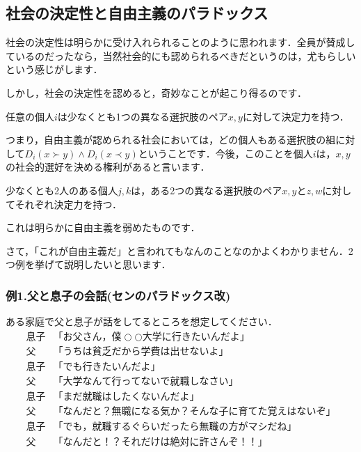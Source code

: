 \subsection{社会の決定性と自由主義のパラドックス}

社会の決定性は明らかに受け入れられることのように思われます．全員が賛成しているのだったなら，当然社会的にも認められるべきだというのは，尤もらしいという感じがします．

しかし，社会の決定性を認めると，奇妙なことが起こり得るのです．

\begin{dfn}[自由主義]
    任意の個人$i$は少なくとも1つの異なる選択肢のペア$x,y$に対して決定力を持つ．
\end{dfn}

つまり，自由主義が認められる社会においては，どの個人もある選択肢の組に対して$D_i(x \succ y) \land D_i(x \prec y)$ということです．今後，このことを個人$i$は，$x,y$の社会的選好を決める権利があると言います．

\begin{dfn}[弱い自由主義]
    少なくとも2人のある個人$j,k$は，ある2つの異なる選択肢のペア$x,y$と$z,w$に対してそれぞれ決定力を持つ．
\end{dfn}

これは明らかに自由主義を弱めたものです．

さて，「これが自由主義だ」と言われてもなんのことなのかよくわかりません．2つ例を挙げて説明したいと思います．

\subsubsection*{例1.父と息子の会話(センのパラドックス改)}
ある家庭で父と息子が話をしてるところを想定してください．
\begin{align*}
    息子 &　「お父さん，僕○○大学に行きたいんだよ」 \\
    父   &　「うちは貧乏だから学費は出せないよ」 \\
    息子 &　「でも行きたいんだよ」 \\
    父   &　「大学なんて行ってないで就職しなさい」 \\
    息子 &　「まだ就職はしたくないんだよ」 \\
    父   &　「なんだと？無職になる気か？そんな子に育てた覚えはないぞ」 \\
    息子 &　「でも，就職するぐらいだったら無職の方がマシだね」 \\
    父   &　「なんだと！？それだけは絶対に許さんぞ！！」
\end{align*}

